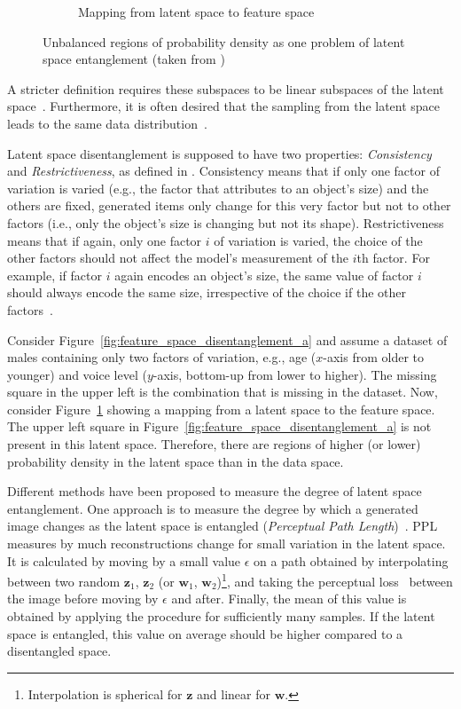 \begin{figure}
\begin{subfigure}{.3\textwidth}
        \caption{Mapping from latent space to feature space}
        \label{fig:feature_space_disentanglement_b}
    \end{subfigure}
    \caption[Latent Space Entanglement]{Unbalanced regions of probability density as one problem of latent space entanglement (taken from \citet{karras2019style})}
    \label{fig:feature_space_disentanglement}
\end{figure}
A stricter definition requires these subspaces to be linear subspaces of the latent space~\citep{higgins2018towards}.
Furthermore, it is often desired that the sampling from the latent space leads to the same data distribution~\citep{karras2019style}.

Latent space disentanglement is supposed to have two properties: \textit{Consistency} and \textit{Restrictiveness}, as defined in \citet{Shu2020Weakly}.
Consistency means that if only one factor of variation is varied (e.g., the factor that attributes to an object's size) and the others are fixed, generated items only change for this very factor but not to other factors (i.e., only the object's size is changing but not its shape).
Restrictiveness means that if again, only one factor $i$ of variation is varied, the choice of the other factors should not affect the model's measurement of the $i$th factor.
For example, if factor $i$ again encodes an object's size, the same value of factor $i$ should always encode the same size, irrespective of the choice if the other factors~\citep{Shu2020Weakly}.

Consider Figure~\ref{fig:feature_space_disentanglement_a} and assume a dataset of males containing only two factors of variation, e.g., age ($x$-axis from older to younger) and voice level ($y$-axis, bottom-up from lower to higher).
The missing square in the upper left is the combination  that is missing in the dataset.
Now, consider Figure~\ref{fig:feature_space_disentanglement_b} showing a mapping from a latent space to the feature space.
The upper left square in Figure~\ref{fig:feature_space_disentanglement_a} is not present in this latent space.
Therefore, there are regions of higher (or lower) probability density in the latent space than in the data space.

Different methods have been proposed to measure the degree of latent space entanglement.
One approach is to measure the degree by which a generated image changes as the latent space is entangled (\textit{Perceptual Path Length})~\citep{karras2019style}.
\ac{PPL} measures by much reconstructions change for small variation in the latent space.
It is calculated by moving by a small value $\epsilon$ on a path obtained by interpolating between two random $\bm{z}_1$, $\bm{z}_2$ (or $\bm{w}_1$, $\bm{w}_2$)\footnote{Interpolation is spherical for $\bm{z}$ and linear for $\bm{w}$.}, and taking the perceptual loss~\citep{johnson2016perceptual} between the image before moving by $\epsilon$ and after.
Finally, the mean of this value is obtained by applying the procedure for sufficiently many samples.
If the latent space is entangled, this value on average should be higher compared to a disentangled space.

